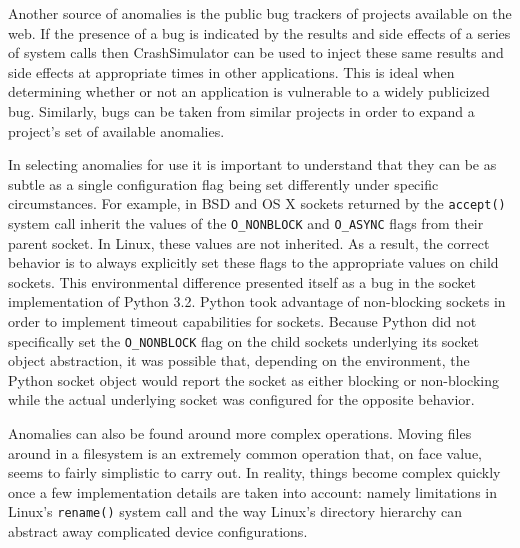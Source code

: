 Another source of anomalies is the public bug trackers of projects
available on the web.  If the presence of a bug is indicated by the results
and side effects of a series of system calls then CrashSimulator can be
used to inject these same results and side effects at appropriate times in
other applications.  This is ideal when determining whether or not an
application is vulnerable to a widely publicized bug.  Similarly, bugs can
be taken from similar projects in order to expand a project's set of
available anomalies.

In selecting anomalies for use it is important to understand that they can
be as subtle as a single configuration flag being set differently under
specific circumstances.  For example, in BSD and OS X sockets returned by
the {\tt accept()} system call inherit the values of the {\tt O\_NONBLOCK}
and {\tt O\_ASYNC} flags from their parent socket.  In Linux, these values
are not inherited.  As a result, the correct behavior is to always
explicitly set these flags to the appropriate values on child sockets.
This environmental difference presented itself as a bug in the socket
implementation of Python 3.2.  Python took advantage of non-blocking
sockets in order to implement timeout capabilities for sockets.  Because
Python did not specifically set the {\tt O\_NONBLOCK} flag on the child
sockets underlying its socket object abstraction, it was possible that,
depending on the environment, the Python socket object would report the
socket as either blocking or non-blocking while the actual underlying
socket was configured for the opposite behavior.

Anomalies can also be found around more complex operations.  Moving files
around in a filesystem is an extremely common operation that, on face
value, seems to fairly simplistic to carry out.  In reality, things become
complex quickly once a few implementation details are taken into account:
namely limitations in Linux's {\tt rename()} system call and the way
Linux's directory hierarchy can abstract away complicated device
configurations.


